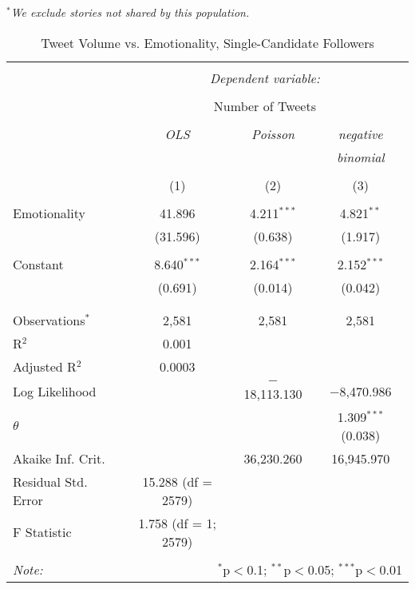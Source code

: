 \emph{$^{*}$We exclude stories not shared by this population.} 
\newpage 
\begin{table}[!htbp] \centering 
  \caption{Tweet Volume vs. Emotionality, Single-Candidate Followers} 
  \label{} 
    \begin{tabular}{@{\extracolsep{5pt}}lccc} 
    \\[-1.8ex]\hline 
    \hline \\[-1.8ex] 
     & \multicolumn{3}{c}{\textit{Dependent variable:}} \\ 
    \cline{2-4} 
    \\[-1.8ex] & \multicolumn{3}{c}{Number of Tweets} \\ 
    \\[-1.8ex] & \textit{OLS} & \textit{Poisson} & \textit{negative} \\ 
     & \textit{} & \textit{} & \textit{binomial} \\ 
    \\[-1.8ex] & (1) & (2) & (3)\\ 
    \hline \\[-1.8ex] 
     Emotionality & 41.896 & 4.211$^{***}$ & 4.821$^{**}$ \\ 
      & (31.596) & (0.638) & (1.917) \\ 
      & & & \\ 
     Constant & 8.640$^{***}$ & 2.164$^{***}$ & 2.152$^{***}$ \\ 
      & (0.691) & (0.014) & (0.042) \\ 
      & & & \\ 
    \hline \\[-1.8ex] 
    Observations$^{*}$ & 2,581 & 2,581 & 2,581 \\ 
    R$^{2}$ & 0.001 &  &  \\ 
    Adjusted R$^{2}$ & 0.0003 &  &  \\ 
    Log Likelihood &  & $-$18,113.130 & $-$8,470.986 \\ 
    $\theta$ &  &  & 1.309$^{***}$  (0.038) \\ 
    Akaike Inf. Crit. &  & 36,230.260 & 16,945.970 \\ 
    Residual Std. Error & 15.288 (df = 2579) &  &  \\ 
    F Statistic & 1.758 (df = 1; 2579) &  &  \\ 
    \hline 
    \hline \\[-1.8ex] 
    \textit{Note:}  & \multicolumn{3}{r}{$^{*}$p$<$0.1; $^{**}$p$<$0.05; $^{***}$p$<$0.01} \\ 
    \end{tabular} 
\end{table}
